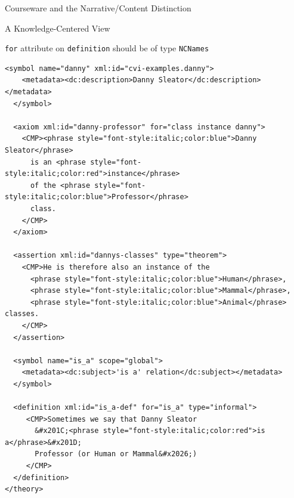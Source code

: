\begin{tchapter}[id=courseware]{Courseware and the Narrative/Content Distinction}
\begin{tsection}[id=knowledge-centered]{A Knowledge-Centered View}
\begin{erratum}[reported-by=Michael Kohlhase,date=2009-08-11]{{\texttt{for}} attribute on
    {\texttt{definition}} should be of type {\texttt{NCNames}}}
\begin{lstlisting}[label=lst:ann-cvi-ex,
    caption={The {\omdoc} Representation for Slide 3 from {\myfigref{15-211}}},
    index={theory,imports,axiom,symbol,assertion,definition,CMP}]
  <symbol name="danny" xml:id="cvi-examples.danny">
    <metadata><dc:description>Danny Sleator</dc:description></metadata>
  </symbol>

  <axiom xml:id="danny-professor" for="class instance danny">
    <CMP><phrase style="font-style:italic;color:blue">Danny Sleator</phrase>
      is an <phrase style="font-style:italic;color:red">instance</phrase> 
      of the <phrase style="font-style:italic;color:blue">Professor</phrase> 
      class.
    </CMP>
  </axiom>

  <assertion xml:id="dannys-classes" type="theorem">
    <CMP>He is therefore also an instance of the 
      <phrase style="font-style:italic;color:blue">Human</phrase>, 
      <phrase style="font-style:italic;color:blue">Mammal</phrase>, 
      <phrase style="font-style:italic;color:blue">Animal</phrase> classes.
    </CMP>
  </assertion>

  <symbol name="is_a" scope="global">
    <metadata><dc:subject>'is a' relation</dc:subject></metadata>
  </symbol>

  <definition xml:id="is_a-def" for="is_a" type="informal">
     <CMP>Sometimes we say that Danny Sleator 
       &#x201C;<phrase style="font-style:italic;color:red">is a</phrase>&#x201D; 
       Professor (or Human or Mammal&#x2026;)
     </CMP>
  </definition>
</theory>
\end{lstlisting}
\end{erratum}


\end{tsection}
\end{tchapter}
